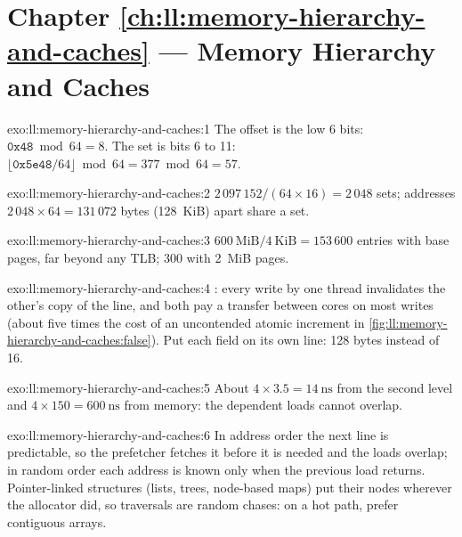 \section*{Chapter \ref{ch:ll:memory-hierarchy-and-caches} --- Memory Hierarchy and Caches}

\begin{solution}{exo:ll:memory-hierarchy-and-caches:1}
The offset is the low 6 bits: $\texttt{0x48} \bmod 64 = 8$. The set is bits 6 to 11: $\lfloor\texttt{0x5e48}/64\rfloor
\bmod 64 = 377 \bmod 64 = 57$.
\end{solution}

\begin{solution}{exo:ll:memory-hierarchy-and-caches:2}
$2\,097\,152 / (64 \times 16) = 2\,048$ sets; addresses $2\,048 \times 64 = 131\,072$ bytes (128~KiB) apart share a set.
\end{solution}

\begin{solution}{exo:ll:memory-hierarchy-and-caches:3}
$600~\text{MiB}/4~\text{KiB} = 153\,600$ entries with base pages, far beyond any TLB; 300 with 2~MiB pages.
\end{solution}

\begin{solution}{exo:ll:memory-hierarchy-and-caches:4}
: every write by one thread invalidates the other's copy of the line, and both pay a transfer between cores
on most writes (about five times the cost of an uncontended atomic increment in
\cref{fig:ll:memory-hierarchy-and-caches:false}). Put each field on its own line: 128 bytes instead of 16.
\end{solution}

\begin{solution}{exo:ll:memory-hierarchy-and-caches:5}
About $4 \times 3.5 = \qty{14}{\nano\second}$ from the second level and $4 \times 150 = \qty{600}{\nano\second}$ from
memory: the dependent loads cannot overlap.
\end{solution}

\begin{solution}{exo:ll:memory-hierarchy-and-caches:6}
In address order the next line is predictable, so the prefetcher fetches it before it is needed and the loads overlap;
in random order each address is known only when the previous load returns. Pointer-linked structures (lists, trees,
node-based maps) put their nodes wherever the allocator did, so traversals are random chases: on a hot path, prefer
contiguous arrays.
\end{solution}


